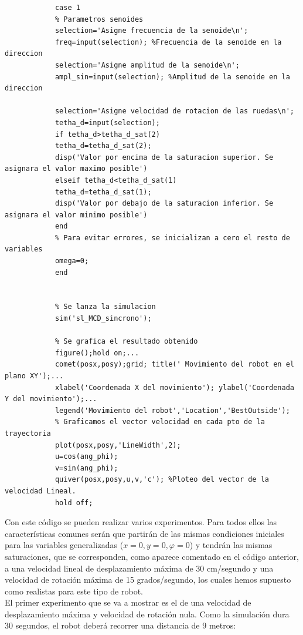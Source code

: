\documentclass[a4paper,twoside]{article}
\begin{document}
\begin{itemize}
\begin{lstlisting}[frame=single]
			% SI SE DESEA QUE EL ROBOT SIGA UNA TRAYECTORIA SENOIDAL
			case 1
			% Parametros senoides
			selection='Asigne frecuencia de la senoide\n';
			freq=input(selection); %Frecuencia de la senoide en la direccion
			selection='Asigne amplitud de la senoide\n';
			ampl_sin=input(selection); %Amplitud de la senoide en la direccion
			
			selection='Asigne velocidad de rotacion de las ruedas\n';
			tetha_d=input(selection);
			if tetha_d>tetha_d_sat(2)
			tetha_d=tetha_d_sat(2);
			disp('Valor por encima de la saturacion superior. Se asignara el valor maximo posible')
			elseif tetha_d<tetha_d_sat(1)
			tetha_d=tetha_d_sat(1);
			disp('Valor por debajo de la saturacion inferior. Se asignara el valor minimo posible')
			end
			% Para evitar errores, se inicializan a cero el resto de variables
			omega=0;
			end
			
			
			% Se lanza la simulacion
			sim('sl_MCD_sincrono');
			
			% Se grafica el resultado obtenido
			figure();hold on;...
			comet(posx,posy);grid; title(' Movimiento del robot en el plano XY');...
			xlabel('Coordenada X del movimiento'); ylabel('Coordenada Y del movimiento');...
			legend('Movimiento del robot','Location','BestOutside');
			% Graficamos el vector velocidad en cada pto de la trayectoria
			plot(posx,posy,'LineWidth',2);
			u=cos(ang_phi);
			v=sin(ang_phi);
			quiver(posx,posy,u,v,'c'); %Ploteo del vector de la velocidad Lineal.
			hold off;
			\end{lstlisting} 
	\end{itemize}

	Con este código se pueden realizar varios experimentos. Para todos ellos las características comunes serán que partirán de las mismas condiciones iniciales para las variables generalizadas ($x=0, y=0, \varphi=0$) y tendrán las mismas saturaciones, que se corresponden, como aparece comentado en el código anterior, a una velocidad lineal de desplazamiento máxima de 30 cm/segundo y una velocidad de rotación máxima de 15 grados/segundo, los cuales hemos supuesto como realistas para este tipo de robot.\\
	
	El primer experimento que se va a mostrar es el de una velocidad de desplazamiento máxima y velocidad de rotación nula. Como la simulación dura 30 segundos, el robot deberá recorrer una distancia de 9 metros:
	
\end{document}
